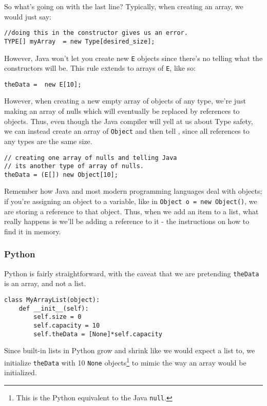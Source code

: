 So what's going on with the last line?
Typically, when creating an array, we would just say:

\begin{verbatim}
//doing this in the constructor gives us an error.
TYPE[] myArray  = new Type[desired_size];
\end{verbatim}

However, Java won't let you create new \texttt{E} objects since there's no telling what the constructors will be.  This rule extends to arrays of \texttt{E}, like so:
\begin{verbatim}
theData =  new E[10];
\end{verbatim}

However, when creating a new empty array of objects of any type, we're just making an array of nulls which will eventually be replaced by references to objects.  Thus, even though the Java compiler will yell at us about Type safety, we can instead create an array of \texttt{Object} and then tell , since all references to any types are the same size.

\begin{verbatim}
// creating one array of nulls and telling Java 
// its another type of array of nulls. 
theData = (E[]) new Object[10];
\end{verbatim}



Remember how Java and most modern programming languages deal with objects; if you're assigning an object to a variable, like in \texttt{Object o = new Object()}, we are storing a reference to that object.
Thus, when we add an item to a list, what really happens is we'll be adding a reference to it - the instructions on how to find it in memory.


\subsubsection{Python}
Python is fairly straightforward, with the caveat that we are pretending \texttt{theData} is an array, and not a list.

\begin{verbatim}
class MyArrayList(object):
	def __init__(self):
		self.size = 0
		self.capacity = 10
		self.theData = [None]*self.capacity
\end{verbatim}

Since built-in lists in Python grow and shrink like we would expect a list to, we initialize \texttt{theData} with 10 \texttt{None} objects\footnote{This is the Python equivalent to the Java \texttt{null}.} to mimic the way an array would be initialized.



